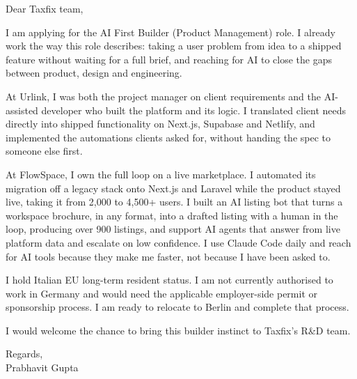 \documentclass[a4paper,11pt]{article}
\begin{document}
Dear Taxfix team,

I am applying for the AI First Builder (Product Management) role. I already work the way this role describes: taking a user problem from idea to a shipped feature without waiting for a full brief, and reaching for AI to close the gaps between product, design and engineering.

At Urlink, I was both the project manager on client requirements and the AI-assisted developer who built the platform and its logic. I translated client needs directly into shipped functionality on Next.js, Supabase and Netlify, and implemented the automations clients asked for, without handing the spec to someone else first.

At FlowSpace, I own the full loop on a live marketplace. I automated its migration off a legacy stack onto Next.js and Laravel while the product stayed live, taking it from 2,000 to 4,500+ users. I built an AI listing bot that turns a workspace brochure, in any format, into a drafted listing with a human in the loop, producing over 900 listings, and support AI agents that answer from live platform data and escalate on low confidence. I use Claude Code daily and reach for AI tools because they make me faster, not because I have been asked to.

I hold Italian EU long-term resident status. I am not currently authorised to work in Germany and would need the applicable employer-side permit or sponsorship process. I am ready to relocate to Berlin and complete that process.

I would welcome the chance to bring this builder instinct to Taxfix's R\&D team.

Regards,\\
Prabhavit Gupta
\end{document}
